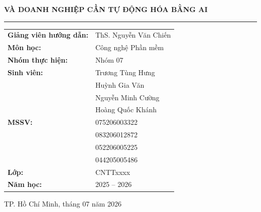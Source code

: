 \begin{titlepage}
\begin{center}
{\Large\bfseries
VÀ DOANH NGHIỆP CẦN TỰ ĐỘNG HÓA BẰNG AI
}

\vspace{0.8cm}

\rule{0.9\textwidth}{0.6pt}

\vspace{1cm}


\renewcommand{\arraystretch}{1.5}

\begin{tabular}{p{5cm}p{9cm}}

\textbf{Giảng viên hướng dẫn:}
&
ThS. Nguyễn Văn Chiến
\\

\textbf{Môn học:}
&
Công nghệ Phần mềm
\\

\textbf{Nhóm thực hiện:}
&
Nhóm 07
\\

\textbf{Sinh viên:}
&
Trương Tùng Hưng
\\
&
Huỳnh Gia Văn
\\
&
Nguyễn Minh Cường
\\
&
Hoàng Quốc Khánh
\\

\textbf{MSSV:}
&
075206003322
\\
&
083206012872
\\
&
052206005225
\\
&
044205005486
\\

\textbf{Lớp:}
&
CNTTxxxx
\\

\textbf{Năm học:}
&
2025 -- 2026

\end{tabular}

\vfill


{\large
TP. Hồ Chí Minh, tháng 07 năm 2026
}

\end{center}

\end{titlepage}